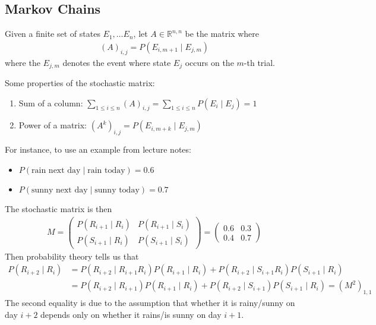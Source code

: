 \documentclass{article}
\begin{document}
\subsection{Markov Chains}
Given a finite set of states $E_1, \dots E_n$, let $A\in \mathbb{R}^{n,n}$ be the matrix where
\begin{align*}
	(A)_{i,j}=P(E_{i,m+1}\mid E_{j,m})
\end{align*}
where the $E_{j,m}$ denotes the event where state $E_j$ occurs on the $m$-th trial.

Some properties of the stochastic matrix:
\begin{enumerate}
	\item Sum of a column: $\sum_{1\leq i\leq n}(A)_{i,j}= \sum_{1\leq i\leq n}P(E_i\mid E_j)=1$
	\item Power of a matrix: $(A^k)_{i,j}=P(E_{i, m+k}\mid E_{j, m})$
\end{enumerate}

For instance, to use an example from lecture notes:
\begin{itemize}
	\item $P(\text{rain next day} \mid \text{rain today}) = 0.6$
	\item $P(\text{sunny next day} \mid \text{sunny today}) = 0.7$
\end{itemize}
The stochastic matrix is then 
\begin{align*}
	M=\begin{pmatrix}
		P(R_{i+1}\mid R_i) & P(R_{i+1}\mid S_i)\\
		P(S_{i+1}\mid R_i) & P(S_{i+1}\mid S_i)
	\end{pmatrix}
	=
	\begin{pmatrix}
		0.6 & 0.3\\
		0.4 & 0.7
	\end{pmatrix}
\end{align*}
Then probability theory tells us that
\begin{align*}
	P(R_{i+2}\mid R_i) &= P(R_{i+2}\mid R_{i+1}R_i)P(R_{i+1}\mid R_i)+P(R_{i+2}\mid S_{i+1}R_i)P(S_{i+1}\mid R_i)\\
	&= P(R_{i+2}\mid R_{i+1})P(R_{i+1}\mid R_i)+P(R_{i+2}\mid S_{i+1})P(S_{i+1}\mid R_i)=(M^2)_{1,1}
\end{align*}
The second equality is due to the assumption that whether it is rainy/sunny  on day $i+2$ depends only on whether it rains/is sunny on day $i+1$.
\end{document}
